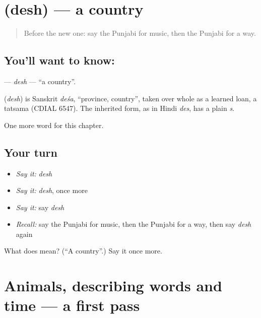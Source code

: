 \section[\texorpdfstring{\pa{ਦੇਸ਼} (desh)}{ਦੇਸ਼ (desh)}]{ (desh) — a country}

\label{lesson:PA-C98-desh}



\begin{quote}
Before the new one: say the Punjabi for music, then the Punjabi for a way.
\end{quote}

\subsection*{You'll want to know: }
\textbf{} — \emph{desh} — \textquotedblleft{}a country\textquotedblright{}.

\begin{cousinweb}
\textbf{} (\emph{desh}) is Sanskrit \emph{deśa}, \textquotedblleft{}province, country\textquotedblright{}, taken over whole as a learned loan, a tatsama (CDIAL 6547). The inherited form, as in Hindi \emph{des}, has a plain \emph{s}.
\end{cousinweb}

\begin{grammarlens}[title={What you've built}]
One more word for this chapter.
\end{grammarlens}

\subsection*{Your turn}
\begin{itemize}
\raggedright
  \item \emph{Say it:} \emph{desh}
  \item \emph{Say it:} \emph{desh}, once more
  \item \emph{Say it:} say \emph{desh}
  \item \emph{Recall:} say the Punjabi for music, then the Punjabi for a way, then say \emph{desh} again
\end{itemize}

\begin{tcolorbox}[breakable,colback=teal!4,colframe=teal!35!black,title={Before you move on}]
What does  mean? (\textquotedblleft{}A country\textquotedblright{}.) Say it once more.
\end{tcolorbox}
\section[(dialogue)]{Animals, describing words and time — a first pass}

